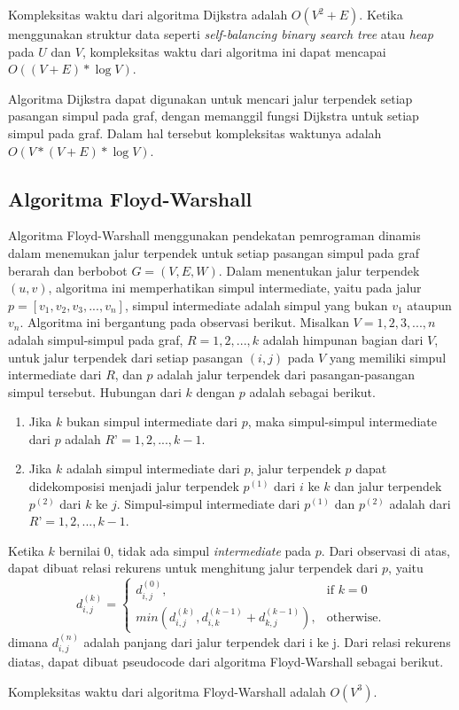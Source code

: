     \medskip
    

    Kompleksitas waktu dari algoritma Dijkstra adalah $O(V^{2} + E)$. Ketika menggunakan struktur data seperti \textit{self-balancing binary search tree} 
    atau \textit{heap} pada $U$ dan $V$, kompleksitas waktu dari algoritma ini dapat mencapai $O((V + E) * \log V)$.

    Algoritma Dijkstra dapat digunakan untuk mencari jalur terpendek setiap pasangan simpul pada graf, dengan memanggil fungsi Dijkstra untuk setiap simpul pada graf. 
    Dalam hal tersebut kompleksitas waktunya adalah $O(V*(V + E)* \log V)$.

    \subsection{Algoritma Floyd-Warshall}
    Algoritma Floyd-Warshall menggunakan pendekatan pemrograman dinamis dalam menemukan jalur terpendek untuk setiap pasangan simpul pada graf berarah dan 
    berbobot $G = (V, E, W)$. Dalam menentukan jalur terpendek $(u,v)$, algoritma ini memperhatikan simpul intermediate, yaitu pada jalur 
    $p = [v_{1}, v_{2}, v_{3}, ..., v_{n}]$, simpul intermediate adalah simpul yang bukan $v_{1}$ ataupun $v_{n}$. Algoritma ini bergantung pada observasi berikut. 
    Misalkan $V = {1, 2, 3, ..., n}$ adalah simpul-simpul pada graf, $R = {1, 2, ..., k}$ adalah himpunan bagian dari $V$, untuk jalur terpendek dari 
    setiap pasangan $(i, j)$ pada $V$ yang memiliki simpul intermediate dari $R$, dan $p$ adalah jalur terpendek dari pasangan-pasangan simpul tersebut. 
    Hubungan dari $k$ dengan $p$ adalah sebagai berikut.

    \begin{enumerate}
        \item Jika $k$ bukan simpul intermediate dari $p$, maka simpul-simpul intermediate dari $p$ adalah $R’ = {1, 2, ..., k-1}$.
        \item Jika $k$ adalah simpul intermediate dari $p$, jalur terpendek $p$ dapat didekomposisi menjadi jalur terpendek $p^{(1)}$ dari $i$ ke $k$ 
        dan jalur terpendek $p^{(2)}$ dari $k$ ke $j$. Simpul-simpul intermediate dari $p^{(1)}$ dan $p^{(2)}$ adalah dari $R’ = {1, 2, ..., k-1}$.
    \end{enumerate}

    Ketika $k$ bernilai 0, tidak ada simpul \textit{intermediate} pada $p$. Dari observasi di atas, dapat dibuat relasi rekurens untuk menghitung jalur terpendek dari $p$, yaitu
    \begin{equation}
        d_{i,j}^{(k)} =
        \begin{cases}
            d_{i,j}^{(0)}, & \text{if } k = 0\\
            min(d_{i,j}^{(k)}, d_{i,k}^{(k-1)} + d_{k,j}^{(k-1)}), & \text{otherwise}.
        \end{cases}
    \end{equation}
    dimana $d_{i,j}^{(n)}$ adalah panjang dari jalur terpendek dari i ke j. Dari relasi rekurens diatas, dapat dibuat pseudocode dari algoritma Floyd-Warshall sebagai berikut.

    \medskip
    

    Kompleksitas waktu dari algoritma Floyd-Warshall adalah $O(V^{3})$.
